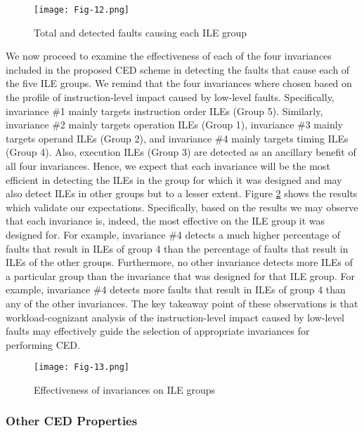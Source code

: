 \documentclass[12pt]{yalephd}
\begin{document}
\begin{figure}[!ht]
\centering
\texttt{[image: Fig-12.png]}\caption{Total and detected faults causing each ILE group} \label{sC3fILEGroupsDetected}
\end{figure}

 We now proceed to examine the effectiveness of each of the four invariances included in the proposed CED scheme in detecting the faults that cause each of the five ILE groups. We remind that the four invariances where chosen based on the profile of instruction-level impact caused by low-level faults. Specifically, invariance \#1 mainly targets instruction order ILEs (Group 5). Similarly, invariance \#2 mainly targets operation ILEs (Group 1), invariance \#3 mainly targets operand ILEs (Group 2), and invariance \#4 mainly targets timing ILEs (Group 4). Also, execution ILEs (Group 3) are detected as an ancillary benefit of all four invariances. Hence, we expect that each invariance will be the most efficient in detecting the ILEs in the group for which it was designed and may also detect ILEs in other groups but to a lesser extent. Figure \ref{sC3fILE_CED} shows the results which validate our expectations. Specifically, based on the results we may observe that each invariance is, indeed, the most effective on the ILE group it was designed for. For example, invariance \#4 detects a much higher percentage of faults that result in ILEs of group 4 than the percentage of faults that result in ILEs of the other groups. Furthermore, no other invariance detects more ILEs of a particular group than the invariance that was designed for that ILE group. For example, invariance \#4 detects more faults that result in ILEs of group 4 than any of the other invariances. The key takeaway point of these observations is that workload-cognizant analysis of the instruction-level impact caused by low-level faults may effectively guide the selection of appropriate invariances for performing CED.

\begin{figure}[!ht]
\centering
\texttt{[image: Fig-13.png]}
\caption{Effectiveness of invariances on ILE groups}\label{sC3fILE_CED}
\end{figure}

\subsubsection{Other CED Properties}
\end{document}
